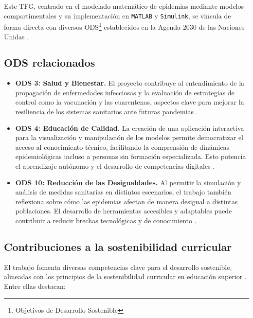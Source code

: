 
Este TFG, centrado en el modelado matemático de epidemias mediante modelos compartimentales y su implementación en \texttt{MATLAB} y \texttt{Simulink}, se vincula de forma directa con diversos ODS\footnote{Objetivos de Desarrollo Sostenible} establecidos en la Agenda 2030 de las Naciones Unidas \cite{onu2015agenda2030}.

\subsection{ODS relacionados}

\begin{itemize}
    \item \textbf{ODS 3: Salud y Bienestar.} El proyecto contribuye al entendimiento de la propagación de enfermedades infecciosas y la evaluación de estrategias de control como la vacunación y las cuarentenas, aspectos clave para mejorar la resiliencia de los sistemas sanitarios ante futuras pandemias \cite{who2020disorder}.
    
    \item \textbf{ODS 4: Educación de Calidad.} La creación de una aplicación interactiva para la visualización y manipulación de los modelos permite democratizar el acceso al conocimiento técnico, facilitando la comprensión de dinámicas epidemiológicas incluso a personas sin formación especializada. Esto potencia el aprendizaje autónomo y el desarrollo de competencias digitales \cite{unesco2020education}.
    
    \item \textbf{ODS 10: Reducción de las Desigualdades.} Al permitir la simulación y análisis de medidas sanitarias en distintos escenarios, el trabajo también reflexiona sobre cómo las epidemias afectan de manera desigual a distintas poblaciones. El desarrollo de herramientas accesibles y adaptables puede contribuir a reducir brechas tecnológicas y de conocimiento \cite{who2021inequality}.
\end{itemize}

\subsection{Contribuciones a la sostenibilidad curricular}

El trabajo fomenta diversas competencias clave para el desarrollo sostenible, alineadas con los principios de la sostenibilidad curricular en educación superior \cite{lozano2017teaching}. Entre ellas destacan:

